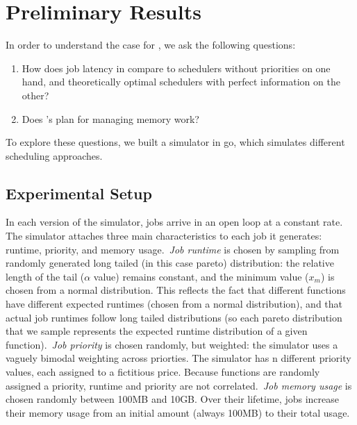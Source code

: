 \section{Preliminary Results}



In order to understand the case for \sys{}, we ask the following questions: 
\begin{enumerate}
    \item How does job latency in \sys{} compare to schedulers without
    priorities on one hand, and theoretically optimal schedulers with perfect
    information on the other?
    \item Does \sys{}'s plan for managing memory work?
\end{enumerate}


To explore these questions, we built a simulator in go\cite{TODO}, which
simulates different scheduling approaches.


\subsection{Experimental Setup}

In each version of the simulator, jobs arrive in an open loop at a constant
rate. The simulator attaches three main characteristics to each job it
generates: runtime, priority, and memory usage.\ \textit{Job runtime} is chosen
by sampling from randomly generated long tailed (in this case pareto)
distribution: the relative length of the tail ($\alpha$ value) remains constant,
and the minimum value ($x_m$) is chosen from a normal distribution. This
reflects the fact that different functions have different expected runtimes
(chosen from a normal distribution), and that actual job runtimes follow long
tailed distributions (so each pareto distribution that we sample represents the
expected runtime distribution of a given function).\ \textit{Job priority} is
chosen randomly, but weighted: the simulator uses a vaguely bimodal weighting
across priorties. The simulator has n different priority values, each assigned
to a fictitious price. Because functions are randomly assigned a priority,
runtime and priority are not correlated.\ \textit{Job memory usage} is chosen
randomly between 100MB and 10GB. Over their lifetime, jobs increase their memory
usage from an initial amount (always 100MB) to their total usage.

